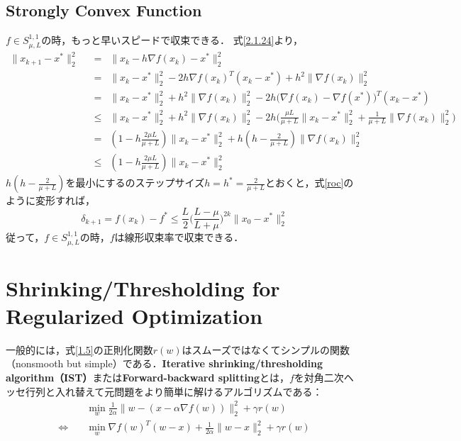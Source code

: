 \documentclass[a4paper,11pt]{jsarticle}
\numberwithin{theorem}{section}  %
\numberwithin{equation}{section} %
\begin{document}
\subsection{Strongly Convex Function}
$f \in S_{\mu,L}^{1,1} $の時，もっと早いスピードで収束できる．
式\ref{2.1.24}より，
\begin{equation}
\begin{split}
\| x_{k+1} - x^* \|_2^2 & \,\,\, = \,\,\, \| x_k - h\nabla f(x_k) - x^* \|_2^2 \\
& \,\,\, = \,\,\, \| x_k - x^* \|_2^2 - 2h\nabla f(x_k)^T(x_k - x^*) + h^2\| \nabla f(x_k) \|_2^2 \\
& \,\,\, = \,\,\, \| x_k - x^* \|_2^2 + h^2\| \nabla f(x_k) \|_2^2 -  2h\bigr(\nabla f(x_k) - \nabla f(x^*)\bigr)^T(x_k - x^*) \\
& \,\,\, \le \,\,\, \| x_k - x^* \|_2^2 + h^2\| \nabla f(x_k) \|_2^2 -  2h\bigr( \frac{\mu L}{\mu + L}\| x_k - x^*\|_2^2 + \frac{1}{\mu + L}\| \nabla f(x_k) \|_2^2 \bigr)\\
& \,\,\, = \,\,\, (1- h\frac{2\mu L}{\mu + L})\| x_k - x^* \|_2^2 + h(h - \frac{2}{\mu + L}) \| \nabla f(x_k) \|_2^2 \\
& \,\,\, \le \,\,\, (1- h\frac{2\mu L}{\mu + L})\| x_k - x^* \|_2^2
\end{split}
\end{equation}
$h(h - \frac{2}{\mu + L})$を最小にするのステップサイズ$h = h^* = \frac{2}{\mu + L}$とおくと，式\ref{roc}のように変形すれば，
\begin{equation}
\delta_{k+1} = f(x_k) - f^* \le \frac{L}{2} \Bigr( \frac{L-\mu}{L+\mu} \Bigr)^{2k} \| x_0 - x^* \|_2^2
\end{equation}
従って，$f \in S_{\mu,L}^{1,1}$の時，$f$は線形収束率で収束できる．

\section{Shrinking/Thresholding for Regularized Optimization}
一般的には，式\ref{1.5}の正則化関数$r(w)$はスムーズではなくてシンプルの関数（nonsmooth but simple）である．{\bf Iterative shrinking/thresholding algorithm（IST）}または{\bf Forward-backward splitting}とは，$f$を対角二次ヘッセ行列と入れ替えて元問題をより簡単に解けるアルゴリズムである：
\begin{equation}
\begin{split}
& \min_{w} \frac{1}{2\alpha}\| w - ( x - \alpha \nabla f(w) )  \|_2^2 + \gamma r(w) \\
\Leftrightarrow \,\,\,\,\,\,& \min_{w} \nabla f(w)^T(w - x) + \frac{1}{2\alpha}\| w - x \|_2^2 + \gamma r(w)
\end{split}
\end{equation}
\end{document}
